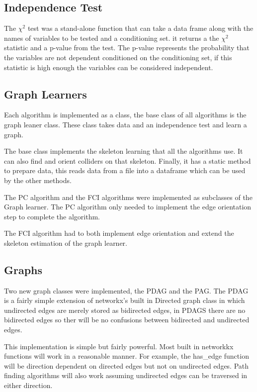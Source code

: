 \documentclass{UoYCSproject}
\begin{document}
\subsection{Independence Test}
The $\chi^2$ test was a stand-alone function that can take a data frame along with the names of variables to be tested and a conditioning set. it returns a the $\chi^2$ statistic and a p-value from the test. The p-value represents the probability that the variables are not dependent conditioned on the conditioning set, if this statistic is high enough the variables can be considered independent.

\subsection{Graph Learners}
Each algorithm is implemented as a class, the base class of all algorithms is the graph leaner class. These class takes data and an independence test and learn a graph.

The base class implements the skeleton learning that all the algorithms use. It can also find and orient colliders on that skeleton. Finally, it has a static method to prepare data, this reads data from a file into a dataframe which can be used by the other methods.

The PC algorithm and the FCI algorithms were implemented as subclasses of the Graph learner. The PC algorithm only needed to implement the edge orientation step to complete the algorithm.

The FCI algorithm had to both implement edge orientation and extend the skeleton estimation of the graph learner.


\subsection{Graphs}  
Two new graph classes were implemented, the PDAG and the PAG. The PDAG is a fairly simple extension of networkx's built in Directed graph class in which undirected edges are merely stored as bidirected edges, in PDAGS there are no bidirected edges so ther will be no confusions between bidirected and undirected edges.

This implementation is simple but fairly powerful. Most built in networkkx functions will work in a reasonable manner. For example, the has\_edge function will be direction dependent on directed edges but not on undirected edges. Path finding algorithms will also work assuming undirected edges can be traversed in either direction.
\end{document}
